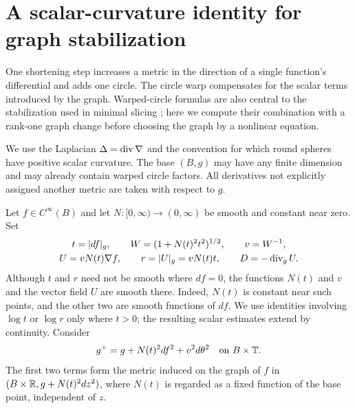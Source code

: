 \section{A scalar-curvature identity for graph stabilization}
\label{sec:graph-calculus}

One shortening step increases a metric in the direction of a single
function's differential and adds one circle. The circle warp compensates
for the scalar terms introduced by the graph. Warped-circle formulas are
also central to the stabilization used in minimal slicing
\cite[Lemma~2.5]{SchoenYau2017}; here we compute their combination with a
rank-one graph change before choosing the graph by a nonlinear equation.

We use the Laplacian $\Delta=\operatorname{div}\nabla$ and the convention for which
round spheres have positive scalar curvature. The base $(B,g)$ may have
any finite dimension and may already contain warped circle factors. All
derivatives not explicitly assigned another metric are taken with respect
to $g$.

Let $f\in C^\infty(B)$ and let $N:[0,\infty)\to(0,\infty)$ be smooth and constant near zero. Set
\begin{equation}\label{eq:graph-quantities}
 \begin{gathered}
 t=\lvert df\rvert_g,\qquad W=(1+N(t)^2t^2)^{1/2},\qquad v=W^{-1},\\
 U=vN(t)\nabla f,\qquad r=\lvert U\rvert_g=vN(t)t,\qquad
 D=-\operatorname{div}_g U.
 \end{gathered}
\end{equation}
Although $t$ and $r$ need not be smooth where $df=0$, the functions $N(t)$
and $v$ and the vector field $U$ are smooth there. Indeed, $N(t)$ is
constant near such points, and the other two are smooth functions of $df$.
We use identities involving $\log t$ or $\log r$ only where $t>0$; the
resulting scalar estimates extend by continuity. Consider
\begin{equation}\label{eq:graph-metric-update}
 g^+=g+N(t)^2df^2+v^2d\theta^2
 \quad\text{on }B\times\mathbb T.
\end{equation}
The first two terms form the metric induced on the graph of $f$ in
$(B\times\mathbb R,g+N(t)^2dz^2)$, where $N(t)$ is regarded as a fixed function of the base point, independent of $z$.

